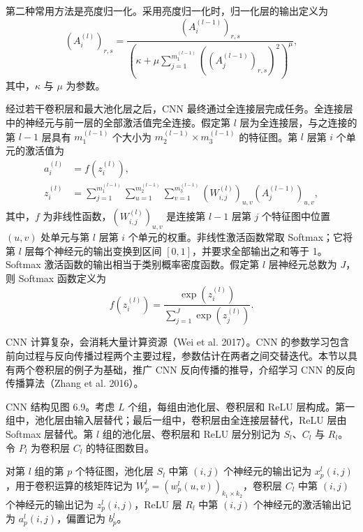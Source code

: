 第二种常用方法是亮度归一化。采用亮度归一化时，归一化层的输出定义为
\begin{equation}
(A_i^{(l)})_{r,s}=\frac{(A_i^{(l-1)})_{r,s}}{\left(\kappa+\mu\displaystyle\sum_{j=1}^{m_1^{(l-1)}}((A_j^{(l-1)})_{r,s})^2\right)^\mu},
\tag{6.98}
\end{equation}
其中，$\kappa$ 与 $\mu$ 为参数。


经过若干卷积层和最大池化层之后，CNN 最终通过全连接层完成任务。全连接层中的神经元与前一层的全部激活值完全连接。假定第 $l$ 层为全连接层，与之连接的第 $l-1$ 层具有 $m_1^{(l-1)}$ 个大小为 $m_2^{(l-1)}\times m_3^{(l-1)}$ 的特征图。第 $l$ 层第 $i$ 个单元的激活值为
\begin{equation}
\begin{aligned}
a_i^{(l)}&=f(z_i^{(l)}),\\
z_i^{(l)}&=\sum_{j=1}^{m_1^{(l-1)}}\sum_{u=1}^{m_2^{(l-1)}}\sum_{v=1}^{m_3^{(l-1)}}(W_{i,j}^{(l)})_{u,v}(A_j^{(l-1)})_{u,v},
\end{aligned}\tag{6.99}
\end{equation}
其中，$f$ 为非线性函数，$(W_{i,j}^{(l)})_{u,v}$ 是连接第 $l-1$ 层第 $j$ 个特征图中位置 $(u,v)$ 处单元与第 $l$ 层第 $i$ 个单元的权重。非线性激活函数常取 Softmax；它将第 $l$ 层每个神经元的输出变换到区间 $[0,1]$，并要求全部输出之和等于 1。Softmax 激活函数的输出相当于类别概率密度函数。假定第 $l$ 层神经元总数为 $J$，则 Softmax 函数定义为
\begin{equation}
f(z_i^{(l)})=\frac{\exp(z_i^{(l)})}{\displaystyle\sum_{j=1}^J\exp(z_j^{(l)})}.
\tag{6.100}
\end{equation}


CNN 计算复杂，会消耗大量计算资源（Wei et al. 2017）。CNN 的参数学习包含前向过程与反向传播过程两个主要过程，参数估计在两者之间交替迭代。本节以具有两个卷积层的例子为基础，推广 CNN 反向传播的推导，介绍学习 CNN 的反向传播算法（Zhang et al. 2016）。

CNN 结构见图 6.9。考虑 $L$ 个组，每组由池化层、卷积层和 ReLU 层构成。第一组中，池化层由输入层替代；最后一组中，卷积层由全连接层替代，ReLU 层由 Softmax 层替代。第 $l$ 组的池化层、卷积层和 ReLU 层分别记为 $S_l$、$C_l$ 与 $R_l$。令 $P_l$ 为卷积层 $C_l$ 的特征图数目。


对第 $l$ 组的第 $p$ 个特征图，池化层 $S_l$ 中第 $(i,j)$ 个神经元的输出记为 $x_p^l(i,j)$，用于卷积运算的核矩阵记为 $W_p^l=(w_p^l(u,v))_{k_1\times k_2}$，卷积层 $C_l$ 中第 $(i,j)$ 个神经元的输出记为 $z_p^l(i,j)$，ReLU 层 $R_l$ 中第 $(i,j)$ 个神经元的激活输出记为 $a_p^l(i,j)$，偏置记为 $b_p^l$。

